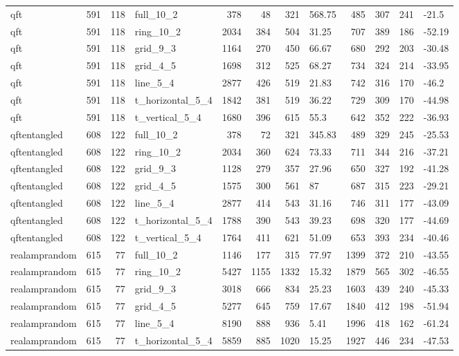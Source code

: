 \begin{longtable}{lrrlrrrlrrrl}
qft & 591 & 118 & full\_10\_2 & 378 & 48 & 321 & 568.75 & 485 & 307 & 241 & -21.5 \\
qft & 591 & 118 & ring\_10\_2 & 2034 & 384 & 504 & 31.25 & 707 & 389 & 186 & -52.19 \\
qft & 591 & 118 & grid\_9\_3 & 1164 & 270 & 450 & 66.67 & 680 & 292 & 203 & -30.48 \\
qft & 591 & 118 & grid\_4\_5 & 1698 & 312 & 525 & 68.27 & 734 & 324 & 214 & -33.95 \\
qft & 591 & 118 & line\_5\_4 & 2877 & 426 & 519 & 21.83 & 742 & 316 & 170 & -46.2 \\
qft & 591 & 118 & t\_horizontal\_5\_4 & 1842 & 381 & 519 & 36.22 & 729 & 309 & 170 & -44.98 \\
qft & 591 & 118 & t\_vertical\_5\_4 & 1680 & 396 & 615 & 55.3 & 642 & 352 & 222 & -36.93 \\
qftentangled & 608 & 122 & full\_10\_2 & 378 & 72 & 321 & 345.83 & 489 & 329 & 245 & -25.53 \\
qftentangled & 608 & 122 & ring\_10\_2 & 2034 & 360 & 624 & 73.33 & 711 & 344 & 216 & -37.21 \\
qftentangled & 608 & 122 & grid\_9\_3 & 1128 & 279 & 357 & 27.96 & 650 & 327 & 192 & -41.28 \\
qftentangled & 608 & 122 & grid\_4\_5 & 1575 & 300 & 561 & 87 & 687 & 315 & 223 & -29.21 \\
qftentangled & 608 & 122 & line\_5\_4 & 2877 & 414 & 543 & 31.16 & 746 & 311 & 177 & -43.09 \\
qftentangled & 608 & 122 & t\_horizontal\_5\_4 & 1788 & 390 & 543 & 39.23 & 698 & 320 & 177 & -44.69 \\
qftentangled & 608 & 122 & t\_vertical\_5\_4 & 1764 & 411 & 621 & 51.09 & 653 & 393 & 234 & -40.46 \\
realamprandom & 615 & 77 & full\_10\_2 & 1146 & 177 & 315 & 77.97 & 1399 & 372 & 210 & -43.55 \\
realamprandom & 615 & 77 & ring\_10\_2 & 5427 & 1155 & 1332 & 15.32 & 1879 & 565 & 302 & -46.55 \\
realamprandom & 615 & 77 & grid\_9\_3 & 3018 & 666 & 834 & 25.23 & 1603 & 439 & 240 & -45.33 \\
realamprandom & 615 & 77 & grid\_4\_5 & 5277 & 645 & 759 & 17.67 & 1840 & 412 & 198 & -51.94 \\
realamprandom & 615 & 77 & line\_5\_4 & 8190 & 888 & 936 & 5.41 & 1996 & 418 & 162 & -61.24 \\
realamprandom & 615 & 77 & t\_horizontal\_5\_4 & 5859 & 885 & 1020 & 15.25 & 1927 & 446 & 234 & -47.53 \\

\end{longtable}
